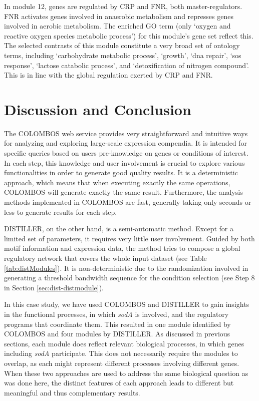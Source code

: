 In module 12, genes are regulated by CRP and FNR, both master-regulators. 
%
FNR activates genes involved in anaerobic metabolism and represses genes
involved in aerobic metabolism.  The enriched GO term (only `oxygen and
reactive oxygen species metabolic process') for this module's gene set reflect
this.
%
The selected contrasts of this module constitute a very broad set of ontology
terms, including `carbohydrate metabolic process', `growth', `dna repair', `sos
response', `lactose catabolic process', and `detoxification of nitrogen
compound'.  This is in line with the global regulation exerted by CRP and FNR.



\section{Discussion and Conclusion}

The COLOMBOS web service provides very straightforward and intuitive
ways for analyzing and exploring large-scale expression compendia. It is
intended for specific queries based on users pre-knowledge on genes or
conditions of interest. In each step, this knowledge and user
involvement is crucial to explore various functionalities in order to
generate good quality results. 
%
It is a deterministic approach, which means that when executing exactly the
same operations, COLOMBOS will generate exactly the same result. Furthermore,
the analysis methods implemented in COLOMBOS are fast, generally taking only
seconds or less to generate results for each step.

DISTILLER, on the other hand, is a semi-automatic method. Except for a limited
set of parameters, it requires very little user involvement. Guided by both
motif information and expression data, the method tries to compose a global
regulatory network that covers the whole input dataset (see Table
\ref{tab:distModules}).
%
It is non-deterministic due to the randomization involved in generating a
threshold bandwidth sequence for the condition selection (see Step 8 in Section
\ref{sec:dist-distmodule}).

In this case study, we have used COLOMBOS and DISTILLER to gain insights in the
functional processes, in which \textit{sodA} is involved, and the regulatory
programs that coordinate them. This resulted in one module identified by
COLOMBOS and four modules by DISTILLER.  As discussed in previous
sections, each module does reflect relevant biological processes, in which
genes including \textit{sodA} participate.  This does not necessarily require
the modules to overlap, as each might represent different processes involving
different genes.  When these two approaches are used to address the same
biological question as was done here, the distinct features of each approach
leads to different but meaningful and thus complementary results.

